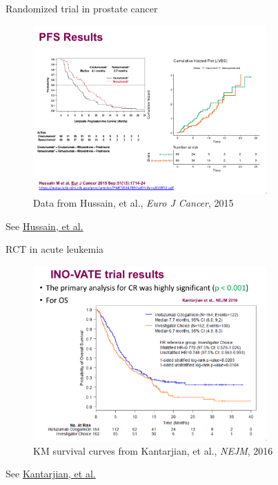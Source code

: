 \documentclass[ignorenonframetext,]{beamer}
\begin{document}
\begin{frame}{%
\protect\hypertarget{randomized-trial-in-prostate-cancer}{%
Randomized trial in prostate cancer}}

\begin{figure}
\centering
\includegraphics[width=0.8\textwidth,height=\textheight]{../figures/hussain.pdf}
\caption{Data from Hussain, et al., \emph{Euro J Cancer}, 2015}
\end{figure}

See \href{../../clinical_papers/hussain.pdf}{Hussain, et al.}

\end{frame}

\begin{frame}{%
\protect\hypertarget{rct-in-acute-leukemia}{%
RCT in acute leukemia}}

\begin{figure}
\centering
\includegraphics[width=0.8\textwidth,height=\textheight]{../figures/kantarjian.pdf}
\caption{KM survival curves from Kantarjian, et al., \emph{NEJM}, 2016}
\end{figure}

See \href{../../kantarjian.pdf}{Kantarjian, et al.}

\end{frame}
\end{document}

